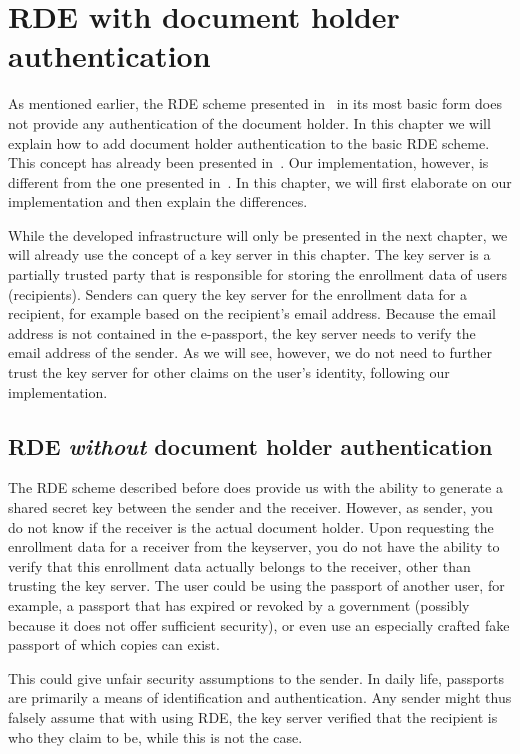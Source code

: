 \chapter{RDE with document holder authentication}\label{ch:rde-with-document-holder-authentication}

As mentioned earlier, the RDE scheme presented in~\cite{verheul2017remote} in its most basic form does not provide any authentication of the document holder.
In this chapter we will explain how to add document holder authentication to the basic RDE scheme.
This concept has already been presented in~\cite{verheul2020secure}.
Our implementation, however, is different from the one presented in~\cite{verheul2020secure}.
In this chapter, we will first elaborate on our implementation and then explain the differences.

While the developed infrastructure will only be presented in the next chapter, we will already use the concept of a key server in this chapter.
The key server is a partially trusted party that is responsible for storing the enrollment data of users (recipients).
Senders can query the key server for the enrollment data for a recipient, for example based on the recipient's email address.
Because the email address is not contained in the e-passport, the key server needs to verify the email address of the sender.
As we will see, however, we do not need to further trust the key server for other claims on the user's identity, following our implementation.

\section{RDE \textit{without} document holder authentication}\label{sec:rde-without-document-holder-authentication}
The RDE scheme described before does provide us with the ability to generate a shared secret key between the sender and the receiver.
However, as sender, you do not know if the receiver is the actual document holder.
Upon requesting the enrollment data for a receiver from the keyserver, you do not have the ability to verify that this enrollment data actually belongs to the receiver, other than trusting the key server.
The user could be using the passport of another user, for example, a passport that has expired or revoked by a government (possibly because it does not offer sufficient security), or even use an especially crafted fake passport of which copies can exist.

This could give unfair security assumptions to the sender.
In daily life, passports are primarily a means of identification and authentication.
Any sender might thus falsely assume that with using RDE, the key server verified that the recipient is who they claim to be, while this is not the case.

